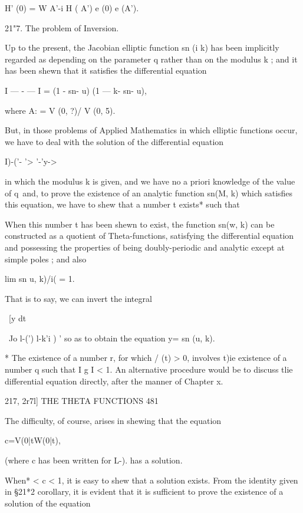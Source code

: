 H' (0) = W A'-i H ( A') e (0) e (A'). 

21"7. The problem of Inversion. 

Up to the present, the Jacobian elliptic function sn (i  k) has been 
implicitly regarded as depending on the parameter q rather than on the 
modulus k ; and it has been shewn that it satisfies the differential equation 

I — -  — I = (1 - sn- u) (1 — k- sn- u), 

where A:  = V (0, ?)/ V (0, 5). 

But, in those problems of Applied Mathematics in which elliptic functions 
occur, we have to deal with the solution of the differential equation 



 I)-('- '> '-'y-> 



in which the modulus k is given, and we have no a priori knowledge of the 
value of q\ and, to prove the existence of an analytic function sn(M, k) 
which satisfies this equation, we have to shew that a number t exists* such 
that 

When this number t has been shewn to exist, the function sn(w, k) can 
be constructed as a quotient of Theta-functions, satisfying the differential 
equation and possessing the properties of being doubly-periodic and analytic 
except at simple poles ; and also 

lim sn u, k)/i( = 1. 

That is to say, we can invert the integral 

\  [y dt 

 ~Jo  l-(')  l-k'i ) ' 
so as to obtain the equation y= sn (u, k). 

* The existence of a number r, for which / (t) > 0, involves t)ie existence of a number q such 
that I g I < 1. An alternative procedure would be to discuss tlie differential equation directly, 
after the manner of Chapter x. 



217, 2r7l] THE THETA FUNCTIONS 481 

The difficulty, of course, arises in shewing that the equation 

c=V(0|tW(0|t), 

(where c has been written for L-). has a solution. 

When* < c < 1, it is easy to shew that a solution exists. From the 
identity given in §21*2 corollary, it is evident that it is sufficient to prove 
the existence of a solution of the equation 

